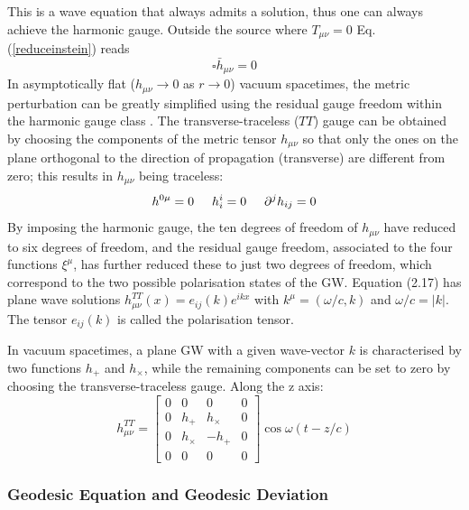 \documentclass[binding=0.6cm, LaM]{sapthesis}
\begin{document}
	This is a wave equation that always admits a solution, thus one can always achieve the harmonic gauge. 
	Outside the source where $T_{\mu\nu} = 0$ Eq.\,(\ref{reduceinstein}) reads 
		\begin{equation}
			\square {\bar h}_{\mu\nu} = 0
		\end{equation}
	In asymptotically flat ($h_{\mu\nu} \rightarrow 0$ as $r \rightarrow 0$) vacuum spacetimes, 
	the metric perturbation can be greatly simplified using
	the residual gauge freedom within the harmonic gauge class \cite{4}. 
	The transverse-traceless ($TT$) gauge can be obtained by choosing the components of the metric tensor $h_{\mu\nu}$
	so that only the ones on the plane orthogonal to the direction of propagation (transverse) 
	are different from zero; this results in $h_{\mu\nu}$ being traceless:
		\begin{equation}
			h^{0\mu} = 0 \hspace*{0.5cm}  h^{i}_i = 0  \hspace*{0.5cm}   {\partial}^jh_{ij} = 0
		\end{equation}
	By imposing the harmonic gauge, the ten degrees of freedom of $h_{\mu\nu}$ 
	have reduced to six degrees of freedom, and the residual gauge freedom,
	associated to the four functions $\xi^{\mu}$, has further reduced these to just two degrees of freedom, 
	which correspond to the two possible polarisation states of the GW. 
	Equation (2.17) has plane wave solutions $h_{\mu\nu}^{TT}(x)=e_{ij}(k)e^{ikx}$ with 
	$k^{\mu}=(\omega/c,k)$ and $\omega/c=|k|$. The tensor $e_{ij}(k)$ is called the polarisation tensor.

	In vacuum spacetimes, a plane GW with a given wave-vector $k$ is characterised 
	by two functions $h_+$ and $h_{\times}$, while the remaining components can be set to zero by
	choosing the transverse-traceless gauge. 
	Along the z axis:
		\begin{equation} 
		h_{\mu\nu}^{TT} = 
		\begin{bmatrix}
		0 & 0 & 0 & 0 \\
		0 & h_{+} & h_{\times} & 0 \\
		0 & h_{\times} & -h_{+} & 0 \\
		0 & 0 & 0 & 0 
		\end{bmatrix}\cos{\omega(t-z/c)}
		\end{equation}

\subsubsection{Geodesic Equation and Geodesic Deviation}
\end{document}
